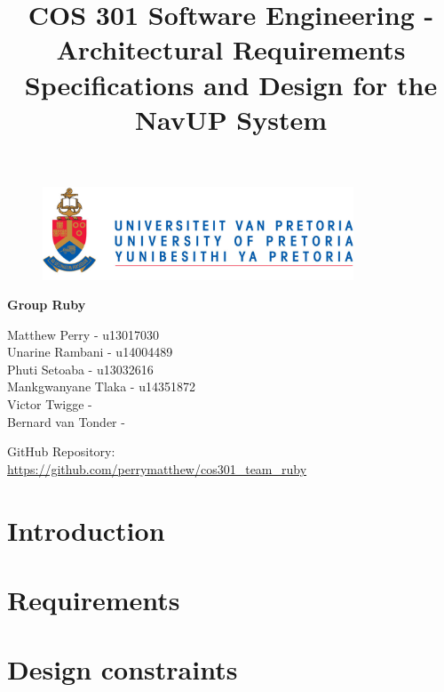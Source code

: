 \documentclass{article}
\begin{document}
		\begin{figure}[t]
			\centering
			\includegraphics[width=350px]{UP_Logo.PNG}
		\end{figure}
			\title{COS 301 Software Engineering -Architectural Requirements Specifications and Design for the NavUP System}
\maketitle
		\begin{center}
			\textbf{\newline Group Ruby} \\
		\end{center}
			
				
		\begin{flushright} \large
			Matthew Perry - u13017030 \\
			Unarine Rambani - u14004489  \\
			Phuti Setoaba -  u13032616\\
			Mankgwanyane Tlaka - u14351872  \\
			Victor Twigge -  \\
			Bernard van Tonder -  \\
		\end{flushright}
		
		
		
		
		GitHub Repository: \href{https://github.com/perrymatthew/cos301_team_ruby}\\
		\url{https://github.com/perrymatthew/cos301_team_ruby}
	

\clearpage
\tableofcontents

\clearpage
\section{Introduction}
	
\clearpage
\section{Requirements}
	
\section{Design constraints}
	
\end{document}
